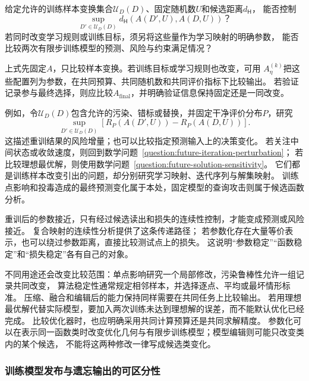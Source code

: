 \begin{mathproblem}[训练样本变换造成的训练模型差异]
  \label{question:future-perturbation-map}
  给定允许的训练样本变换集合$\mathcal U_D(D)$、固定随机数$U$和候选距离$d_{\mathsf H}$，
  能否控制
  \[
    \sup_{D'\in\mathcal U_D(D)}
      d_{\mathsf H}(A(D',U),A(D,U))\text{？}
  \]
  若同时改变学习规则或训练目标，须另将这些量作为学习映射的明确参数，
  能否比较两次有限步训练模型的预测、风险与约束满足情况？
\end{mathproblem}

上式先固定$A$，只比较样本变换。若训练目标或学习规则也改变，可用
$A_\eta^{(k)}$把这些配置列为参数，在共同预算、共同随机数和共同评价指标下比较输出。
若验证记录参与最终选择，则应比较$A_{\mathrm{final}}$，并明确验证信息保持固定还是一同改变。

例如，令$\mathcal U_D(D)$包含允许的污染、错标或替换，并固定干净评价分布$P$，研究
\begin{equation}
  \sup_{D'\in\mathcal U_D(D)}
  \left[R_P(A(D',U))-R_P(A(D,U))\right].
  \label{eq:future-training-robustness-question}
\end{equation}
这描述重训结果的风险增量；也可以比较指定预测输入上的决策变化。
若关注中间状态或收敛速度，则回到数学问题~\ref{question:future-iteration-perturbation}；
若比较理想最优解，则使用数学问题~\ref{question:future-solution-sensitivity}。
它们都是训练样本改变引出的问题，却分别研究学习映射、迭代序列与解集映射。
训练点影响和投毒造成的最终预测变化属于本处，固定模型的查询攻击则属于候选函数分析。

重训后的参数接近，只有经过候选读出和损失的连续性控制，才能变成预测或风险接近。
复合映射的连续性分析提供了这条传递路径；
若参数化存在大量等价表示，也可以绕过参数距离，直接比较测试点上的损失。
这说明“参数稳定”“函数稳定”和“损失稳定”各有自己的对象。

不同用途还会改变比较范围：单点影响研究一个局部修改，污染鲁棒性允许一组记录共同改变，
算法稳定性通常规定相邻样本，并选择逐点、平均或最坏情形标准。
压缩、融合和编辑后的能力保持同样需要在共同任务上比较输出。
若用理想最优解代替实际模型，要加入两次训练未达到理想解的误差，而不能默认优化已经完成。
比较优化器时，也应明确采用共同计算预算还是共同求解精度。
参数化可以在表示同一函数类时改变优化几何与有限步训练模型；模型编辑则可能只改变类内的某个候选，
不能将这两种修改一律写成候选类变化。

\subsubsection{训练模型发布与遗忘输出的可区分性}
\label{sec:future-analysis-output-law}

